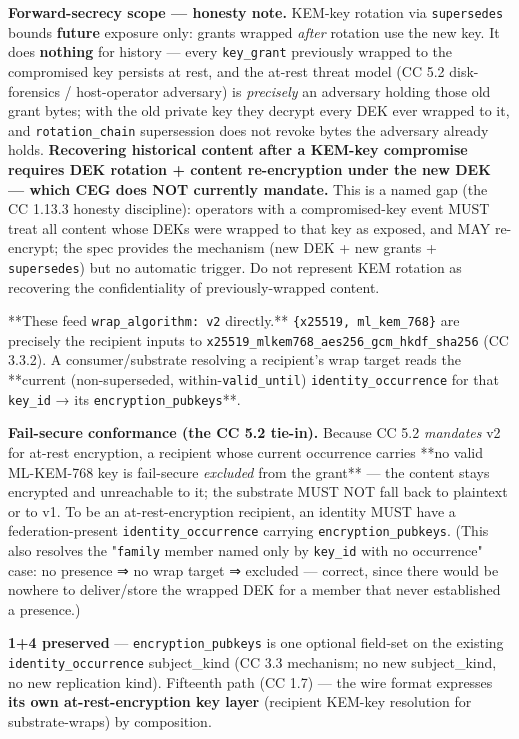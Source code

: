 \documentclass[11pt]{article}
\begin{document}
\textbf{Forward-secrecy scope — honesty note.} KEM-key rotation via \texttt{supersedes} bounds \textbf{future} exposure only: grants wrapped \textit{after} rotation use the new key. It does \textbf{nothing} for history — every \texttt{key\_grant} previously wrapped to the compromised key persists at rest, and the at-rest threat model (CC 5.2 disk-forensics / host-operator adversary) is \textit{precisely} an adversary holding those old grant bytes; with the old private key they decrypt every DEK ever wrapped to it, and \texttt{rotation\_chain} supersession does not revoke bytes the adversary already holds. \textbf{Recovering historical content after a KEM-key compromise requires DEK rotation + content re-encryption under the new DEK — which CEG does NOT currently mandate.} This is a named gap (the CC 1.13.3 honesty discipline): operators with a compromised-key event MUST treat all content whose DEKs were wrapped to that key as exposed, and MAY re-encrypt; the spec provides the mechanism (new DEK + new grants + \texttt{supersedes}) but no automatic trigger. Do not represent KEM rotation as recovering the confidentiality of previously-wrapped content.


**These feed \texttt{wrap\_algorithm: v2} directly.** \texttt{\{x25519, ml\_kem\_768\}} are precisely the recipient inputs to \texttt{x25519\_mlkem768\_aes256\_gcm\_hkdf\_sha256} (CC 3.3.2). A consumer/substrate resolving a recipient's wrap target reads the **current (non-superseded, within-\texttt{valid\_until}) \texttt{identity\_occurrence} for that \texttt{key\_id} → its \texttt{encryption\_pubkeys}**.


\textbf{Fail-secure conformance (the CC 5.2 tie-in).} Because CC 5.2 \textit{mandates} v2 for at-rest encryption, a recipient whose current occurrence carries **no valid ML-KEM-768 key is fail-secure \textit{excluded} from the grant** — the content stays encrypted and unreachable to it; the substrate MUST NOT fall back to plaintext or to v1. To be an at-rest-encryption recipient, an identity MUST have a federation-present \texttt{identity\_occurrence} carrying \texttt{encryption\_pubkeys}. (This also resolves the "\texttt{family} member named only by \texttt{key\_id} with no occurrence" case: no presence ⇒ no wrap target ⇒ excluded — correct, since there would be nowhere to deliver/store the wrapped DEK for a member that never established a presence.)


\textbf{1+4 preserved} — \texttt{encryption\_pubkeys} is one optional field-set on the existing \texttt{identity\_occurrence} subject\_kind (CC 3.3 mechanism; no new subject\_kind, no new replication kind). Fifteenth path (CC 1.7) — the wire format expresses \textbf{its own at-rest-encryption key layer} (recipient KEM-key resolution for substrate-wraps) by composition.
\end{document}
